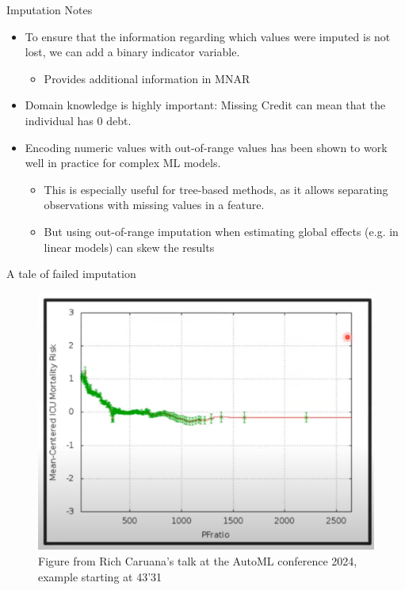 \documentclass[11pt,compress,t,notes=noshow, aspectratio=169, xcolor=table]{beamer}
\begin{document}

\begin{frame}{Imputation Notes}
\begin{itemize}
    \item  To ensure that the information regarding which values were imputed is not lost, we can add a binary indicator variable.
        \begin{itemize}
            \item Provides additional information in MNAR
        \end{itemize}
    \item Domain knowledge is highly important: Missing Credit can mean that the individual has 0 debt.
    \item Encoding numeric values with out-of-range values has been shown to work well in practice for complex ML models.
        \begin{itemize}
            \item This is especially useful for tree-based methods, as it allows separating observations with missing values in a feature.
            \item But using out-of-range imputation when estimating global effects (e.g. in linear models) can skew the results
        \end{itemize}
\end{itemize}    
\end{frame}




\begin{frame}{A tale of failed imputation}
\vfill
\begin{figure}
    \centering
    \includegraphics[width=0.5\linewidth]{slides/07_imputation/figure_man/Screenshot from 2025-06-03 22-38-17.png}
    \caption{Figure from Rich Caruana's talk at the AutoML conference 2024, example starting at 43'31 \href{https://www.youtube.com/watch?v=5mH7Fyy5wQY}{}}
\end{figure}
\vfill
\end{frame}
\end{document}
